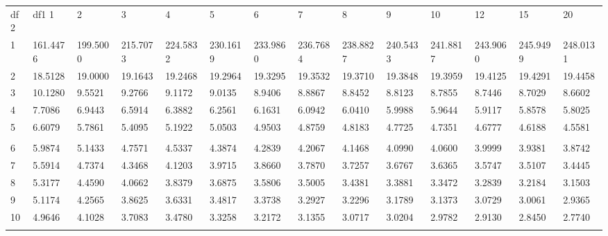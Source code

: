  {
 \fontsize{5pt}{5pt}
 \selectfont
\begin{tabular}{l|lllllllllllll} 
df2  & df1      1  &      2  &      3  &      4  &      5  &      6  &      7  &      8  &      9  &     10  &     12  &     15  &     20   \\ 
  1 & 161.4476 & 199.5000 & 215.7073 & 224.5832 & 230.1619 & 233.9860 & 236.7684 & 238.8827 & 240.5433 & 241.8817 & 243.9060 & 245.9499 & 248.0131 \\[5pt] \arrayrulecolor{light-gray}\hline\arrayrulecolor{black}  
  2 & 18.5128 & 19.0000 & 19.1643 & 19.2468 & 19.2964 & 19.3295 & 19.3532 & 19.3710 & 19.3848 & 19.3959 & 19.4125 & 19.4291 & 19.4458 \\[5pt] \arrayrulecolor{light-gray}\hline\arrayrulecolor{black}  
  3 & 10.1280 & 9.5521 & 9.2766 & 9.1172 & 9.0135 & 8.9406 & 8.8867 & 8.8452 & 8.8123 & 8.7855 & 8.7446 & 8.7029 & 8.6602 \\[5pt] \arrayrulecolor{light-gray}\hline\arrayrulecolor{black}  
  4 & 7.7086 & 6.9443 & 6.5914 & 6.3882 & 6.2561 & 6.1631 & 6.0942 & 6.0410 & 5.9988 & 5.9644 & 5.9117 & 5.8578 & 5.8025 \\[5pt] \arrayrulecolor{light-gray}\hline\arrayrulecolor{black}  
  5 & 6.6079 & 5.7861 & 5.4095 & 5.1922 & 5.0503 & 4.9503 & 4.8759 & 4.8183 & 4.7725 & 4.7351 & 4.6777 & 4.6188 & 4.5581 \\[5pt] \arrayrulecolor{light-gray}\hline\arrayrulecolor{black}  
\\ 
  6 & 5.9874 & 5.1433 & 4.7571 & 4.5337 & 4.3874 & 4.2839 & 4.2067 & 4.1468 & 4.0990 & 4.0600 & 3.9999 & 3.9381 & 3.8742 \\[5pt] \arrayrulecolor{light-gray}\hline\arrayrulecolor{black}  
  7 & 5.5914 & 4.7374 & 4.3468 & 4.1203 & 3.9715 & 3.8660 & 3.7870 & 3.7257 & 3.6767 & 3.6365 & 3.5747 & 3.5107 & 3.4445 \\[5pt] \arrayrulecolor{light-gray}\hline\arrayrulecolor{black}  
  8 & 5.3177 & 4.4590 & 4.0662 & 3.8379 & 3.6875 & 3.5806 & 3.5005 & 3.4381 & 3.3881 & 3.3472 & 3.2839 & 3.2184 & 3.1503 \\[5pt] \arrayrulecolor{light-gray}\hline\arrayrulecolor{black}  
  9 & 5.1174 & 4.2565 & 3.8625 & 3.6331 & 3.4817 & 3.3738 & 3.2927 & 3.2296 & 3.1789 & 3.1373 & 3.0729 & 3.0061 & 2.9365 \\[5pt] \arrayrulecolor{light-gray}\hline\arrayrulecolor{black}  
 10 & 4.9646 & 4.1028 & 3.7083 & 3.4780 & 3.3258 & 3.2172 & 3.1355 & 3.0717 & 3.0204 & 2.9782 & 2.9130 & 2.8450 & 2.7740 \\[5pt] \arrayrulecolor{light-gray}\hline\arrayrulecolor{black}  

\end{tabular}}

